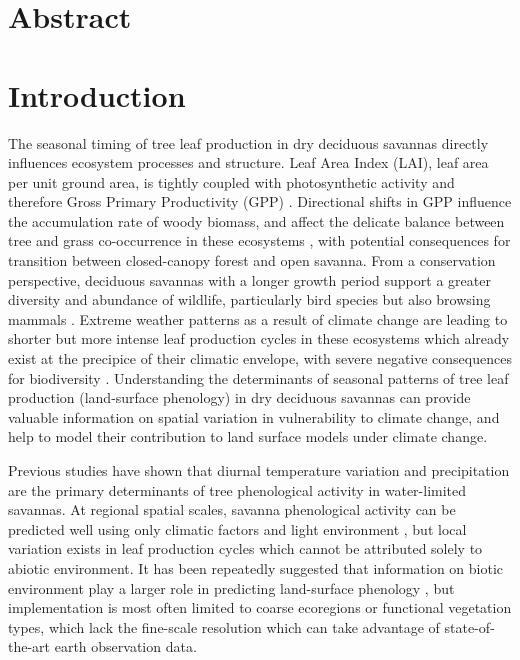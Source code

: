 \documentclass[11pt,a4paper]{article}
\newcommand{\titletext}{Phenology and diversity in Zambia}
\begin{document}


\section*{Abstract}

\section{Introduction}

The seasonal timing of tree leaf production in dry deciduous savannas directly influences ecosystem processes and structure. Leaf Area Index (LAI), leaf area per unit ground area, is tightly coupled with photosynthetic activity and therefore Gross Primary Productivity (GPP) \citep{Gu2003, Penuelas2009}. Directional shifts in GPP influence the accumulation rate of woody biomass, and affect the delicate balance between tree and grass co-occurrence in these ecosystems \citep{Stevens2016}, with potential consequences for transition between closed-canopy forest and open savanna. From a conservation perspective, deciduous savannas with a longer growth period support a greater diversity and abundance of wildlife, particularly bird species but also browsing mammals \citep{Cole2015, Araujo2017, Morellato2016, Ogutu2013}. Extreme weather patterns as a result of climate change are leading to shorter but more intense leaf production cycles in these ecosystems which already exist at the precipice of their climatic envelope, with severe negative consequences for biodiversity \citep{Bale2002}. Understanding the determinants of seasonal patterns of tree leaf production (land-surface phenology) in dry deciduous savannas can provide valuable information on spatial variation in vulnerability to climate change, and help to model their contribution to land surface models under climate change.

Previous studies have shown that diurnal temperature variation and precipitation are the primary determinants of tree phenological activity in water-limited savannas. At regional spatial scales, savanna phenological activity can be predicted well using only climatic factors and light environment \citep{Adole2018a}, but local variation exists in leaf production cycles which cannot be attributed solely to abiotic environment. It has been repeatedly suggested that information on biotic environment play a larger role in predicting land-surface phenology \citep{Adole2018b, Jeganathan2014, Fuller1999}, but implementation is most often limited to coarse ecoregions or functional vegetation types, which lack the fine-scale resolution which can take advantage of state-of-the-art earth observation data. 
\end{document}
